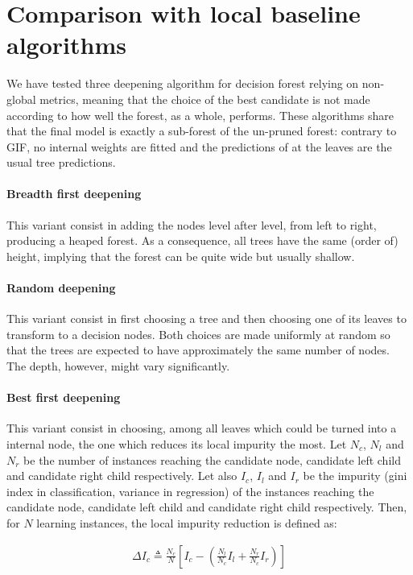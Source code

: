 \documentclass{article}
\begin{document}
\section{Comparison with local baseline algorithms}
We have tested three deepening algorithm for decision forest relying on 
non-global metrics, meaning that the choice of the best candidate is not made 
according to how well the forest, as a whole, performs. These algorithms share 
that the final model is exactly a sub-forest of the un-pruned forest: contrary 
to GIF, no internal weights are fitted and the predictions of at the leaves are 
the usual tree predictions.

\paragraph{Breadth first deepening}
This variant consist in adding the nodes level after level, from left to right, 
producing a heaped forest. As a consequence, all trees have the same (order of) 
height, implying that the forest can be quite wide but usually shallow.

\paragraph{Random deepening}
This variant consist in first choosing a tree and then choosing one of its 
leaves to transform to a decision nodes. Both choices are made uniformly at 
random so that the trees are expected to have approximately the same number of 
nodes. The depth, however, might vary significantly.

\paragraph{Best first deepening}
This variant consist in choosing, among all leaves which could be turned into a 
internal node, the one which reduces its local impurity the most. 
Let $N_c$, $N_l$ and $N_r$ be the number of instances 
reaching the candidate node, candidate left child and candidate right child 
respectively.
Let also $I_c$, $I_l$ and $I_r$ be the impurity (gini index in classification, 
variance in regression) of the instances reaching the candidate node, candidate 
left child and candidate right child respectively. 
Then, for $N$ learning instances, the local impurity reduction is 
defined as:

\begin{align}
\Delta I_c \triangleq \frac{N_c}{N} \left[ I_c - \left( \frac{N_l}{N_c} I_l + 
\frac{N_r}{N_c} I_r \right)\right]
\end{align}
\end{document}
